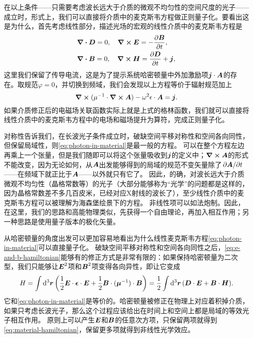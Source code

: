 \documentclass[UTF8, a4paper]{ctexart}
\begin{document}
在以上条件——只需要考虑波长远大于介质的微观不均匀性的空间尺度的光子——成立时，形式上，我们可以直接将介质中的麦克斯韦方程做正则量子化。要看出这是为什么，首先考虑线性部分，描述光场的宏观的线性介质中的麦克斯韦方程是
\[
    \begin{aligned}
        &\div{\vb*{D}} = 0, \quad \curl{\vb*{E}} = - \pdv{\vb*{B}}{t}, \\
        &\div{\vb*{B}} = 0, \quad \curl{\vb*{H}} = \pdv{\vb*{D}}{t} + \vb*{j},
    \end{aligned}
\]
这里我们保留了传导电流，这是为了提示系统哈密顿量中外加激励项$\vb*{j} \cdot \vb*{A}$的存在。取规范$\varphi=0$，并切换到频域，我们会发现以上方程等价于辐射规范加上
\begin{equation}
    \curl{(\mu^{-1} \cdot \curl{\vb*{A}})} - \omega^2 \epsilon \cdot \vb*{A} = \vb*{j}.
    \label{eq:photon-in-material}
\end{equation}
如果介质修正后的电磁场关联函数实际上就是上式的格林函数，我们就可以直接将线性介质中的麦克斯韦方程中的电场和磁场提升为算符，完成正则量子化。

对称性告诉我们，在长波光子条件成立时，破缺空间平移对称性和空间各向同性，但保留局域性，则\eqref{eq:photon-in-material}是最一般的方程。
可以在整个方程左边再乘上一个张量，但是我们随即可以将这个张量吸收到$\vb*{j}$的定义中；$\curl{\vb*{A}}$的形式不能改变，因为无论如何，从$\vb*{A}$出发能够得到的局域的规范不变矢量除了$\pdv*{\vb*{A}}{t}$——在频域下就正比于$\vb*{A}$——以外就只有它了。
因此，的确，对波长远大于介质微观不均匀性（晶格常数等）的光子（大部分能够称为“光学”的问题都是这样的，因为晶格常数差不多几百皮米，已经对应X射线的波长了），至少线性介质中的麦克斯韦方程可以被理解为海森堡绘景下的方程。
非线性项可以如法炮制。因此，在这里，我们的思路和高能物理类似，先获得一个自由理论，再加入相互作用；另一种思路是使用量子版本的极化矢量。

从哈密顿量的角度出发可以更加容易地看出为什么线性麦克斯韦方程\eqref{eq:photon-in-material}可以直接量子化。
破缺空间平移对称性和空间各向同性之后，\eqref{eq:e-and-b-hamiltonian}能够有的修正方式是非常有限的：如果保持哈密顿量为二次型，我们只能够让$\vb*{E}^2$项和$\vb*{B}^2$项变得各向异性，即让它变成
\begin{equation}
    H = \int \dd[3]{\vb*{r}} \left( \frac{1}{2} \vb*{E} \cdot \vb*{\epsilon} \cdot \vb*{E} + \frac{1}{2} \vb*{B} \cdot (\vb*{\mu}^{-1}) \cdot \vb*{B} \right) = \frac{1}{2} \int \dd[3]{\vb*{r}} (\vb*{D} \cdot \vb*{E} + \vb*{B} \cdot \vb*{H}).
    \label{eq:material-hamiltonian}
\end{equation}
它和\eqref{eq:photon-in-material}是等价的。哈密顿量被修正在物理上对应着积掉介质，如果只考虑长波光子，那么这个过程应该给出在时间上和空间上都是局域的等效光子相互作用。
原则上可以产生$\vb*{E}$和$\vb*{B}$的任意次方项，只保留两项就得到\eqref{eq:material-hamiltonian}，保留更多项就得到非线性光学效应。
\end{document}
